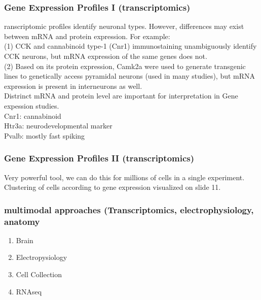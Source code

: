 \begin{itemize}
\begin{itemize}
\subsubsection{Gene Expression Profiles I (transcriptomics)}
ranscriptomic profiles identify neuronal
types. However, differences may exist
between mRNA and protein expression.
For example:
\\(1) CCK and cannabinoid type-1 (Cnr1)
immunostaining unambiguously identify CCK
neurons, but mRNA expression of the same
genes does not.
\\(2) Based on its protein expression, Camk2a
were used to generate transgenic lines to
genetically access pyramidal neurons (used
in many studies), but mRNA expression is
present in interneurons as well.
\\Distrinct mRNA and protein level are important for interpretation in Gene expession studies.
\\Cnr1: cannabinoid
\\Htr3a: neurodevelopmental marker
\\Pvalb: mostly fast spiking

\subsubsection{Gene Expression Profiles II (transcriptomics)}
Very powerful tool, we can do this for millions of cells in a single experiment.
\\Clustering of cells according to gene expression visualized on slide 11.

\subsubsection{multimodal approaches (Transcriptomics, electrophysiology, anatomy}
\begin{enumerate}
    \item Brain
    \item Electropysiology
    \item Cell Collection
    \item RNAseq
\end{enumerate}


\end{itemize}
\end{itemize}
